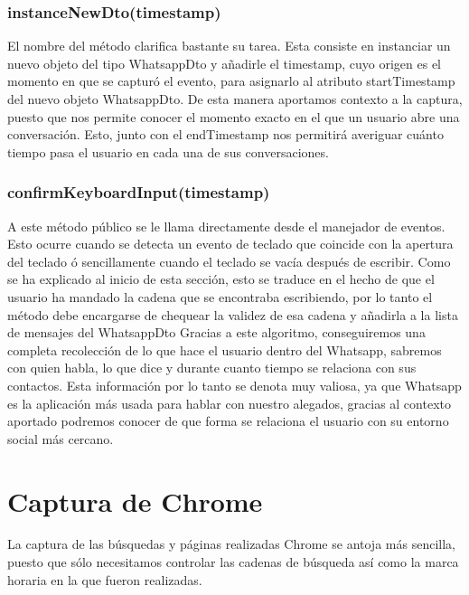 \documentclass[12pt,a4paper,oneside]{book} %
\begin{document}
\subsubsection{instanceNewDto(timestamp)}
El nombre del método clarifica bastante su tarea. Esta consiste en instanciar un nuevo objeto del tipo WhatsappDto y añadirle el timestamp, cuyo origen es el momento en que se capturó el evento, para asignarlo al atributo startTimestamp del nuevo objeto WhatsappDto. 
\newline \newline 
De esta manera aportamos contexto a la captura, puesto que nos permite conocer el momento exacto en el que un usuario abre una conversación. Esto, junto con el endTimestamp nos permitirá averiguar cuánto tiempo pasa el usuario en cada una de sus conversaciones. 
\subsubsection{confirmKeyboardInput(timestamp)}
A este método público se le llama directamente desde el manejador de eventos. Esto ocurre cuando se detecta un evento de teclado que coincide con la apertura del teclado ó sencillamente cuando el teclado se vacía después de escribir. 
\newline \newline 
Como se ha explicado al inicio de esta sección, esto se traduce en el hecho de que el usuario ha mandado la cadena que se encontraba escribiendo, por lo tanto el método debe encargarse de chequear la validez de esa cadena y añadirla a la lista de mensajes del WhatsappDto
\newline \newline 
Gracias a este algoritmo, conseguiremos una completa recolección de lo que hace el usuario dentro del Whatsapp, sabremos con quien habla, lo que dice y durante cuanto tiempo se relaciona con sus contactos. Esta información por lo tanto se denota muy valiosa, ya que Whatsapp es la aplicación más usada para hablar con nuestro alegados, gracias al contexto aportado podremos conocer de que forma se relaciona el usuario con su entorno social más cercano. 
\newpage
\section{Captura de Chrome}
La captura de las búsquedas y páginas realizadas Chrome se antoja más sencilla, puesto que sólo necesitamos controlar las cadenas de búsqueda así como la marca horaria en la que fueron realizadas. 
\end{document}
